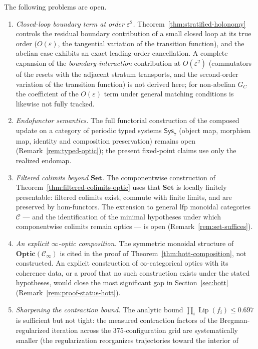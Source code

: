 \documentclass[11pt,a4paper]{article}
\theoremstyle{plain}
\theoremstyle{definition}
\theoremstyle{remark}
\newcommand{\CC}{\mathcal{C}}
\newcommand{\Optic}{\mathbf{Optic}}
\DeclareMathOperator{\Lip}{Lip}
\begin{document}
The following problems are open.

\begin{enumerate}[leftmargin=*,itemsep=3pt]
\item \emph{Closed-loop boundary term at order $\varepsilon^2$.}
Theorem~\ref{thm:stratified-holonomy} controls the residual boundary
contribution of a small closed loop at its true order
($O(\varepsilon)$, the tangential variation of the transition
function), and the abelian case exhibits an exact leading-order
cancellation. A complete expansion of the
\emph{boundary-interaction} contribution at $O(\varepsilon^2)$
(commutators of the resets with the adjacent stratum transports, and
the second-order variation of the transition function) is not
derived here; for non-abelian $G_C$ the coefficient of the
$O(\varepsilon)$ term under general matching conditions is likewise
not fully tracked.
\item \emph{Endofunctor semantics.} The full functorial construction
of the composed update on a category of periodic typed systems
$\mathsf{Sys}_7$ (object map, morphism map, identity and composition
preservation) remains open
(Remark~\ref{rem:typed-optic}); the present fixed-point claims use
only the realized endomap.
\item \emph{Filtered colimits beyond $\mathbf{Set}$.} The
componentwise construction of
Theorem~\ref{thm:filtered-colimits-optic} uses that $\mathbf{Set}$ is
locally finitely presentable: filtered colimits exist, commute with
finite limits, and are preserved by hom-functors. The extension to
general lfp monoidal categories $\CC$ --- and the identification of
the minimal hypotheses under which componentwise colimits remain
optics --- is open (Remark~\ref{rem:set-suffices}).
\item \emph{An explicit $\infty$-optic composition.} The symmetric
monoidal structure of $\Optic(\mathcal{C}_\infty)$ is cited in the
proof of Theorem~\ref{thm:hott-composition}, not constructed. An
explicit construction of $\infty$-categorical optics with its
coherence data, or a proof that no such construction exists under
the stated hypotheses, would close the most significant gap in
Section~\ref{sec:hott} (Remark~\ref{rem:proof-status-hott}).
\item \emph{Sharpening the contraction bound.} The analytic bound
$\prod_i \Lip(f_i) \leq 0.697$ is sufficient but not tight: the
measured contraction factors of the Bregman-regularized iteration
across the $375$-configuration grid are systematically smaller
(the regularization reorganizes trajectories toward the interior of

\end{enumerate}
\end{document}
